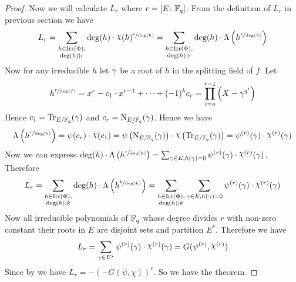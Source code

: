 \begin{proof}
  Now we will calculate $L_r$  where $r=[E\colon \mathbb{F}_q]$. From the definition of $L_r$ in previous section we have $$L_r =  \sum_{\substack{h\in\irr(\Phi),\\ \deg(h)\mid r}}\deg(h)\cdot \chi(h)^{\nicefrac{r}{\deg(h)}}= \sum_{\substack{h\in\irr(\Phi),\\ \deg(h)\mid r}} \deg(h)\cdot \Lambda\lt( h^{\nicefrac{r}{\deg(h)}}\rt)$$Now for any irreducible $h$ let $\gamma$ be a root of $h$ in the splitting field of $f$. Let $$h^{\nicefrac{r}{\deg(f)}}= x^r-c_1\cdot x^{r-1}+\cdots+(-1)^k c_r=\prod_{i=o}^{r-1}\left(X-\gamma^{q^i}\right)$$Hence 
  $c_1=\operatorname{Tr}_{E/\mathbb{F}_q}(\gamma)$ and $c_r=\operatorname{N}_{E/\mathbb{F}_q}(\gamma)$. Hence we have $$\Lambda\lt(h^{\nicefrac{r}{\deg(h)}}\rt)=\psi(c_r)\cdot \chi(c_1)=\psi\lt(\norm_{E/\bbF_q}(\gm)\rt)\cdot \chi\lt(\tr_{E/\bbF_q}(\gm)\rt)=\psi^{(r)}(\gm)\cdot \chi^{(r)}(\gm)$$Now we can express $\deg(h)\cdot \Lambda\lt(h^{\nicefrac{r}{\deg(h)}}\rt)=\sum_{\gm\in E,h(\gm)=0}\psi^{(r)}(\gm)\cdot \chi^{(r)}(\gm)$. 
  Therefore $$L_r= \sum_{\substack{h\in\irr(\Phi),\\ \deg(h)\mid k}} \deg(h)\cdot \Lambda\lt( h^{\nicefrac{k}{\deg(h)}}\rt)=\sum_{\substack{h\in\irr(\Phi),\\ \deg(h)\mid k}}\sum_{\gm\in E,h(\gm)=0}\psi^{(r)}(\gm)\cdot \chi^{(r)}(\gm) $$Now all irreducible polynomials of $\mathbb{F}_q$ whose degree divides $r$ with non-zero constant their roots in $E$ are disjoint sets and partition $E^*$. Therefore we have $$L_r=\sum_{\gm\in E^*}\psi^{(r)}(\gm)\cdot \chi^{(r)}(\gm)=G(\psi^{(r)},\chi^{(r)})$$Since  by  we have $L_r=-(-G(\psi,\chi))^r$. So we have the theorem. 
\end{proof}

